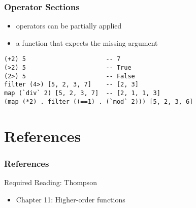 \documentclass[dvipsnames]{beamer}
\theoremstyle{plain}
\begin{document}
\begin{frame}[fragile]
  \frametitle{Operator Sections}

  \begin{itemize}
    \item operators can be partially applied
    \item a function that expects the missing argument
  \end{itemize}

  \begin{exampleblock}{}
    \begin{lstlisting}
(+2) 5                      -- 7
(>2) 5                      -- True
(2>) 5                      -- False
filter (4>) [5, 2, 3, 7]    -- [2, 3]
map (`div` 2) [5, 2, 3, 7]  -- [2, 1, 1, 3]
(map (*2) . filter ((==1) . (`mod` 2))) [5, 2, 3, 6]
    \end{lstlisting}
  \end{exampleblock}
\end{frame}


%
%
%

\section*{References}

\begin{frame}
  \frametitle{References}

  \begin{block}{Required Reading: Thompson}
    \begin{itemize}
      \item Chapter 11: \alert{Higher-order functions}
    \end{itemize}
  \end{block}
\end{frame}
\end{document}
